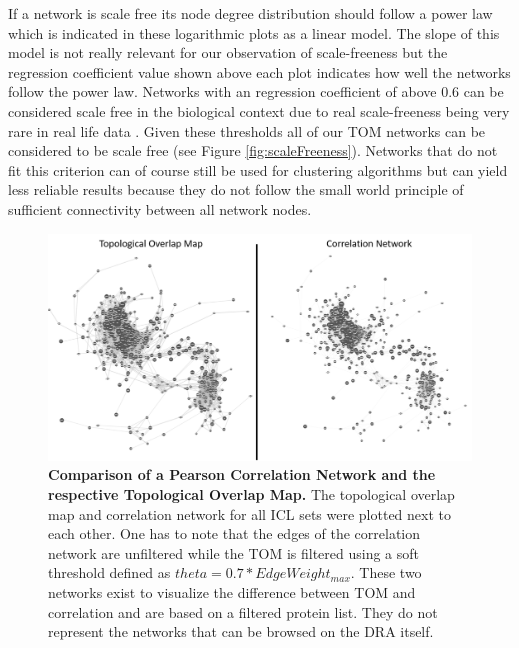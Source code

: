 If a network is scale free its node degree distribution should follow a power law which is indicated in these logarithmic plots as a linear model. The slope of this model is not really relevant for our observation of scale-freeness but the regression coefficient value shown above each plot indicates how well the networks follow the power law. Networks with an regression coefficient of above 0.6 can be considered scale free in the biological context due to real scale-freeness being very rare in real life data \citep{Broido.2019}. Given these thresholds all of our TOM networks can be considered to be scale free (see Figure \ref{fig:scaleFreeness}). Networks that do not fit this criterion can of course still be used for clustering algorithms but can yield less reliable results because they do not follow the small world principle of sufficient connectivity between all network nodes.
\begin{figure}[H]
    \centering
    \includegraphics[width=\textwidth]{resources/images/Results/sim_tom_icl.png}
    \caption[Comparison of a Pearson Correlation Network and the respective Topological Overlap Map]{\textbf{Comparison of a Pearson Correlation Network and the respective Topological Overlap Map. } The topological overlap map and correlation network for all ICL sets were plotted next to each other. One has to note that the edges of the correlation network are unfiltered while the TOM is filtered using a soft threshold defined as $theta = 0.7 * EdgeWeight_{max}$. These two networks exist to visualize the difference between TOM and correlation and are based on a filtered protein list. They do not represent the networks that can be browsed on the DRA itself.}
    \label{fig:tomvscor}
\end{figure}
\newpage
